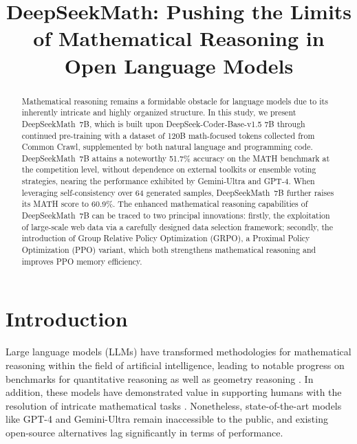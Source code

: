 \title{DeepSeekMath: Pushing the Limits of Mathematical Reasoning in Open Language Models}

\begin{abstract}
Mathematical reasoning remains a formidable obstacle for language models due to its inherently intricate and highly organized structure. In this study, we present DeepSeekMath~7B, which is built upon DeepSeek-Coder-Base-v1.5 7B through continued pre-training with a dataset of 120B math-focused tokens collected from Common Crawl, supplemented by both natural language and programming code. DeepSeekMath~7B attains a noteworthy 51.7\% accuracy on the MATH benchmark at the competition level, without dependence on external toolkits or ensemble voting strategies, nearing the performance exhibited by Gemini-Ultra and GPT-4. When leveraging self-consistency over 64 generated samples, DeepSeekMath~7B further raises its MATH score to 60.9\%. The enhanced mathematical reasoning capabilities of DeepSeekMath~7B can be traced to two principal innovations: firstly, the exploitation of large-scale web data via a carefully designed data selection framework; secondly, the introduction of Group Relative Policy Optimization (GRPO), a Proximal Policy Optimization (PPO) variant, which both strengthens mathematical reasoning and improves PPO memory efficiency.
\end{abstract}

\section{Introduction}

Large language models (LLMs) have transformed methodologies for mathematical reasoning within the field of artificial intelligence, leading to notable progress on benchmarks for quantitative reasoning \citep{MATH} as well as geometry reasoning \citep{trinh2024solving}. In addition, these models have demonstrated value in supporting humans with the resolution of intricate mathematical tasks \citep{tao}. Nonetheless, state-of-the-art models like GPT-4 \citep{gpt4} and Gemini-Ultra \citep{gemini} remain inaccessible to the public, and existing open-source alternatives lag significantly in terms of performance.

